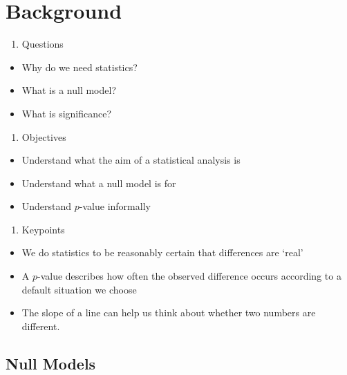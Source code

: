 \documentclass[
]{book}
\providecommand{\tightlist}{%
  \setlength{\itemsep}{0pt}\setlength{\parskip}{0pt}}
\begin{document}
\hypertarget{background}{%
\chapter{Background}\label{background}}

\begin{enumerate}
\def\labelenumi{\arabic{enumi}.}
\tightlist
\item
  Questions
\end{enumerate}

\begin{itemize}
\tightlist
\item
  Why do we need statistics?
\item
  What is a null model?
\item
  What is significance?
\end{itemize}

\begin{enumerate}
\def\labelenumi{\arabic{enumi}.}
\setcounter{enumi}{1}
\tightlist
\item
  Objectives
\end{enumerate}

\begin{itemize}
\tightlist
\item
  Understand what the aim of a statistical analysis is
\item
  Understand what a null model is for
\item
  Understand \(p\)-value informally
\end{itemize}

\begin{enumerate}
\def\labelenumi{\arabic{enumi}.}
\setcounter{enumi}{2}
\tightlist
\item
  Keypoints
\end{enumerate}

\begin{itemize}
\tightlist
\item
  We do statistics to be reasonably certain that differences are `real'
\item
  A \(p\)-value describes how often the observed difference occurs according to a default situation we choose
\item
  The slope of a line can help us think about whether two numbers are different.
\end{itemize}

\hypertarget{null-models}{%
\section{Null Models}\label{null-models}}
\end{document}
